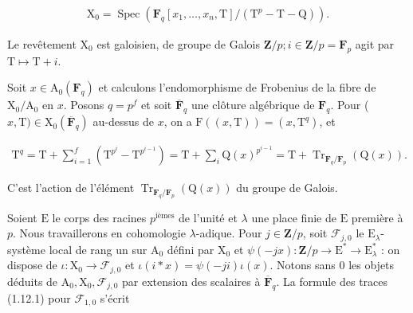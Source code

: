 \documentclass[10pt,leqno]{article}
\begin{document}
\begin{equation*}\begin{gathered}\mathrm{X}_{0} = \operatorname{Spec}(\mathbf{F}_{q}[x_{1},\ldots ,x_{n},\mathrm{T}]/(\mathrm{T}^{p}-\mathrm{T}-\mathrm{Q})).\end{gathered}\end{equation*}

\noindent Le revêtement \(\mathrm{X}_{0}\) est galoisien, de groupe de Galois \(\mathbf{Z}/p; i \in  \mathbf{Z}/p = \mathbf{F}_{p}\) agit par \(\mathrm{T} \longmapsto  \mathrm{T}+i\).\par

\noindent Soit \(x \in  \mathrm{A}_{0}(\mathbf{F}_{q})\) et calculons l'endomorphisme de Frobenius de la fibre de \(\mathrm{X}_{0}/\mathrm{A}_{0}\) en \(x\). Posons \(q = p^{f}\) et soit \(\overline{\mathbf{F}}_{q}\) une clôture algébrique de \(\mathbf{F}_{q}\). Pour (\(x,\mathrm{T}) \in  \mathrm{X}_{0}(\overline{\mathbf{F}}_{q})\) au-dessus de \(x\), on a \(\mathrm{F}((x,\mathrm{T})) = (x,\mathrm{T}^{q})\), et\par

\begin{equation*}\begin{gathered}\mathrm{T}^{q} = \mathrm{T} + \sum _{i=1}^{f} (\mathrm{T}^{p^{i}}-\mathrm{T}^{p^{i-1}}) = \mathrm{T} + \sum _{i} \mathrm{Q}(x)^{p^{i-1}} = \mathrm{T} + \operatorname{Tr}_{\mathbf{F}_{q}/\mathbf{F}_{p}}(\mathrm{Q}(x)).\end{gathered}\end{equation*}

\noindent C'est l'action de l'élément \(\operatorname{Tr}_{\mathbf{F}_{q}/\mathbf{F}_{p}}(\mathrm{Q}(x))\) du groupe de Galois.\par

\noindent Soient \(\mathrm{E}\) le corps des racines \(p^{\mathrm{ièmes}}\) de l'unité et \(\lambda \) une place finie de \(\mathrm{E}\) première à \(p\). Nous travaillerons en cohomologie \(\lambda \)-adique. Pour \(j \in  \mathbf{Z}/p\), soit \(\mathcal{F} _{j,0}\) le \(\mathrm{E}_{\lambda }\)-système local de rang un sur \(\mathrm{A}_{0}\) défini par \(\mathrm{X}_{0}\) et \(\psi (-jx) : \mathbf{Z}/p \longrightarrow  \mathrm{E}^{*} \longrightarrow  \mathrm{E}_{\lambda }^{*}\) : on dispose de \(\iota  : \mathrm{X}_{0} \longrightarrow  \mathcal{F} _{j,0}\) et \(\iota (i*x) = \psi (-ji)\iota (x)\). Notons sans 0 les objets déduits de \(\mathrm{A}_{0}, \mathrm{X}_{0}, \mathcal{F} _{j,0}\) par extension des scalaires à \(\overline{\mathbf{F}}_{q}\). La formule des traces (1.12.1) pour \(\mathcal{F} _{1,0}\) s'écrit\par
\end{document}
